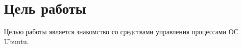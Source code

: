 \thispagestyle{empty}
\section*{Цель работы}

Целью работы является знакомство со средствами управления процессами ОС Ubuntu.